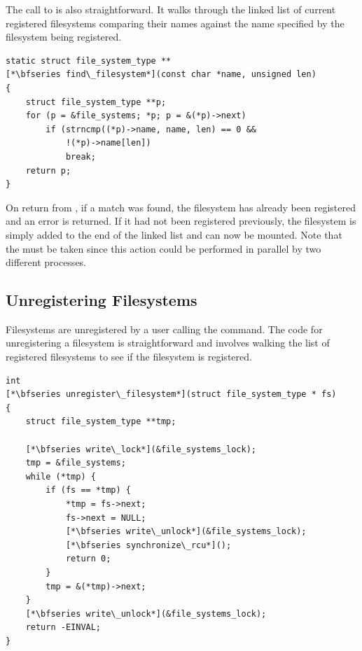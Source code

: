 \noindent
The call to  is also straightforward. It walks through the linked list of current registered filesystems comparing their names against the name specified by the filesystem being registered. 

\begin{lstlisting}
static struct file_system_type **
[*\bfseries find\_filesystem*](const char *name, unsigned len)
{
    struct file_system_type **p;
    for (p = &file_systems; *p; p = &(*p)->next)
        if (strncmp((*p)->name, name, len) == 0 &&
            !(*p)->name[len])
            break;
    return p;
}
\end{lstlisting}

\noindent
On return from , if a match was found, the filesystem has already been registered and an error is returned. If it had not been registered previously, the filesystem is simply added to the end of the linked list and can now be mounted. Note that the  must be taken since this action could be performed in parallel by two different processes.


\subsection{Unregistering Filesystems}

Filesystems are unregistered by a user calling the  command. The code for unregistering a filesystem is straightforward and involves walking the list of registered filesystems to see if the filesystem is registered. 

\begin{lstlisting}
int 
[*\bfseries unregister\_filesystem*](struct file_system_type * fs)
{
    struct file_system_type **tmp;

    [*\bfseries write\_lock*](&file_systems_lock);
    tmp = &file_systems;
    while (*tmp) {
        if (fs == *tmp) {
            *tmp = fs->next;
            fs->next = NULL;
            [*\bfseries write\_unlock*](&file_systems_lock);
            [*\bfseries synchronize\_rcu*]();
            return 0;
        }
        tmp = &(*tmp)->next;
    }
    [*\bfseries write\_unlock*](&file_systems_lock);
    return -EINVAL;
}
\end{lstlisting}

